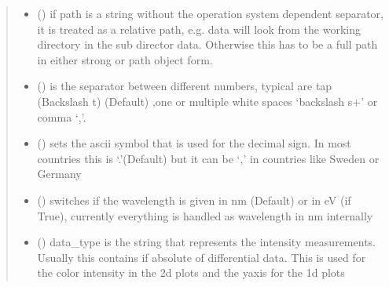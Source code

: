 \documentclass[letterpaper,10pt,english]{sphinxmanual}
\begin{document}
\begin{fulllineitems}
\begin{fulllineitems}
\begin{quote}
\begin{description}
\begin{itemize}
\item {} 
 (\sphinxstyleliteralemphasis{\sphinxupquote{ (}}\sphinxstyleliteralemphasis{\sphinxupquote{)}}) \textendash{} if path is a string without the operation system dependent separator, it is treated as a relative path,
e.g. data will look from the working directory in the sub director data. Otherwise this has to be a
full path in either strong or path object form.

\item {} 
 (\sphinxstyleliteralemphasis{\sphinxupquote{ (}}\sphinxstyleliteralemphasis{\sphinxupquote{)}}) \textendash{} is the separator between different numbers, typical are tap (Backslash t) (Default) ,one or
multiple white spaces ‘backslash s+’ or comma ‘,’.

\item {} 
 (\sphinxstyleliteralemphasis{\sphinxupquote{ (}}\sphinxstyleliteralemphasis{\sphinxupquote{)}}) \textendash{} sets the ascii symbol that is used for the decimal sign. In most countries this is ‘.’(Default)
but it can be ‘,’ in countries like Sweden or Germany

\item {} 
 (\sphinxstyleliteralemphasis{\sphinxupquote{ (}}\sphinxstyleliteralemphasis{\sphinxupquote{)}}) \textendash{} switches if the wavelength is given in nm (Default) or in eV (if True), currently everything
is handled as wavelength in nm internally

\item {} 
 (\sphinxstyleliteralemphasis{\sphinxupquote{, }}) \textendash{} data\_type is the string that represents the intensity measurements. Usually this contains if absolute
of differential data. This is used for the color intensity in the 2d plots and the y\sphinxhyphen{}axis for the 1d plots


\end{itemize}
\end{description}
\end{quote}
\end{fulllineitems}
\end{fulllineitems}
\end{document}

